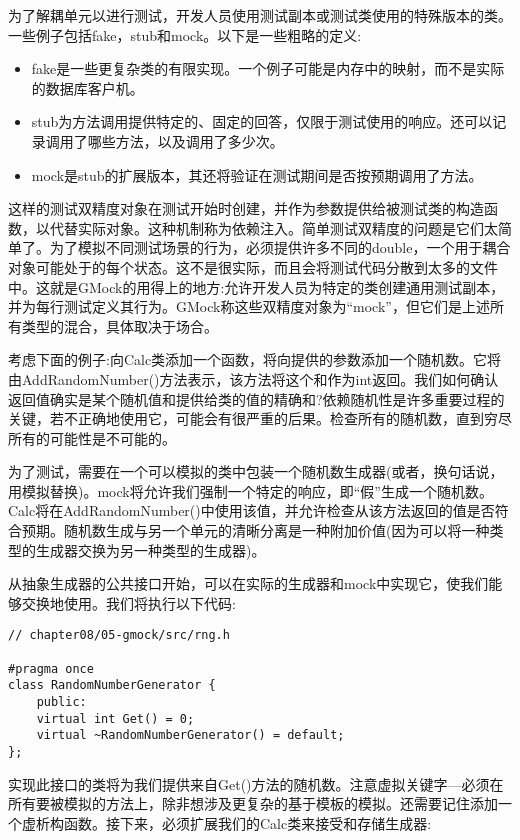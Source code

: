 为了解耦单元以进行测试，开发人员使用测试副本或测试类使用的特殊版本的类。一些例子包括fake，stub和mock。以下是一些粗略的定义:

\begin{itemize}
\item 
fake是一些更复杂类的有限实现。一个例子可能是内存中的映射，而不是实际的数据库客户机。

\item 
stub为方法调用提供特定的、固定的回答，仅限于测试使用的响应。还可以记录调用了哪些方法，以及调用了多少次。

\item 
mock是stub的扩展版本，其还将验证在测试期间是否按预期调用了方法。
\end{itemize}

这样的测试双精度对象在测试开始时创建，并作为参数提供给被测试类的构造函数，以代替实际对象。这种机制称为依赖注入。简单测试双精度的问题是它们太简单了。为了模拟不同测试场景的行为，必须提供许多不同的double，一个用于耦合对象可能处于的每个状态。这不是很实际，而且会将测试代码分散到太多的文件中。这就是GMock的用得上的地方:允许开发人员为特定的类创建通用测试副本，并为每行测试定义其行为。GMock称这些双精度对象为“mock”，但它们是上述所有类型的混合，具体取决于场合。

考虑下面的例子:向Calc类添加一个函数，将向提供的参数添加一个随机数。它将由AddRandomNumber()方法表示，该方法将这个和作为int返回。我们如何确认返回值确实是某个随机值和提供给类的值的精确和?依赖随机性是许多重要过程的关键，若不正确地使用它，可能会有很严重的后果。检查所有的随机数，直到穷尽所有的可能性是不可能的。

为了测试，需要在一个可以模拟的类中包装一个随机数生成器(或者，换句话说，用模拟替换)。mock将允许我们强制一个特定的响应，即“假”生成一个随机数。Calc将在AddRandomNumber()中使用该值，并允许检查从该方法返回的值是否符合预期。随机数生成与另一个单元的清晰分离是一种附加价值(因为可以将一种类型的生成器交换为另一种类型的生成器)。

从抽象生成器的公共接口开始，可以在实际的生成器和mock中实现它，使我们能够交换地使用。我们将执行以下代码:

\begin{lstlisting}[style=styleCXX]
// chapter08/05-gmock/src/rng.h

#pragma once
class RandomNumberGenerator {
	public:
	virtual int Get() = 0;
	virtual ~RandomNumberGenerator() = default;
};
\end{lstlisting}

实现此接口的类将为我们提供来自Get()方法的随机数。注意虚拟关键字—必须在所有要被模拟的方法上，除非想涉及更复杂的基于模板的模拟。还需要记住添加一个虚析构函数。接下来，必须扩展我们的Calc类来接受和存储生成器:

